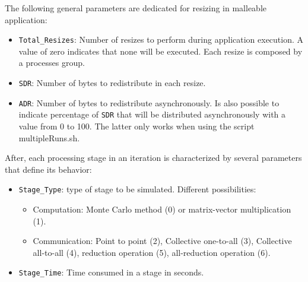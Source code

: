 The following general parameters are dedicated for  resizing in malleable application:
\begin{itemize}
    \item \texttt{Total\_Resizes}: Number of resizes to perform during application execution. A value of zero indicates that none will be executed. Each resize is composed by a processes group.
    \item \texttt{SDR}: Number of bytes to redistribute in each resize.
    \item \texttt{ADR}: Number of bytes to redistribute asynchronously. Is also possible to indicate percentage of \texttt{SDR} that will be distributed asynchronously with a value from 0 to 100. The latter only works when using the script multipleRuns.sh.
\end{itemize}


After, each processing stage in an iteration is characterized by several parameters that define its behavior:
\begin{itemize}
    \item \texttt{Stage\_Type}: type of stage to be simulated. Different possibilities:
    \begin{itemize}
        \item Computation:  Monte Carlo method (0) or matrix-vector multiplication (1).
        \item Communication: Point to point  (2), Collective one-to-all (3),  Collective all-to-all (4), reduction operation (5), all-reduction operation (6). 
    \end{itemize}
    \item \texttt{Stage\_Time}:  Time consumed in a stage in seconds.
    
\end{itemize}

